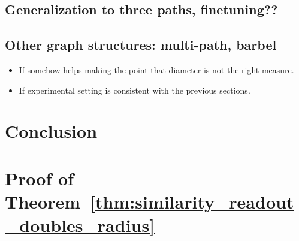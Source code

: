 \documentclass{article}
\begin{document}
\subsection{Generalization to three paths, finetuning??}


\subsection{Other graph structures: multi-path, barbel}
\begin{itemize}
    \item If somehow helps making the point that diameter is not the right measure. 
    \item If experimental setting is consistent with the previous sections. 
\end{itemize}


\section{Conclusion}


\appendix

\section{Proof of Theorem~\ref{thm:similarity_readout_doubles_radius}}
\end{document}
